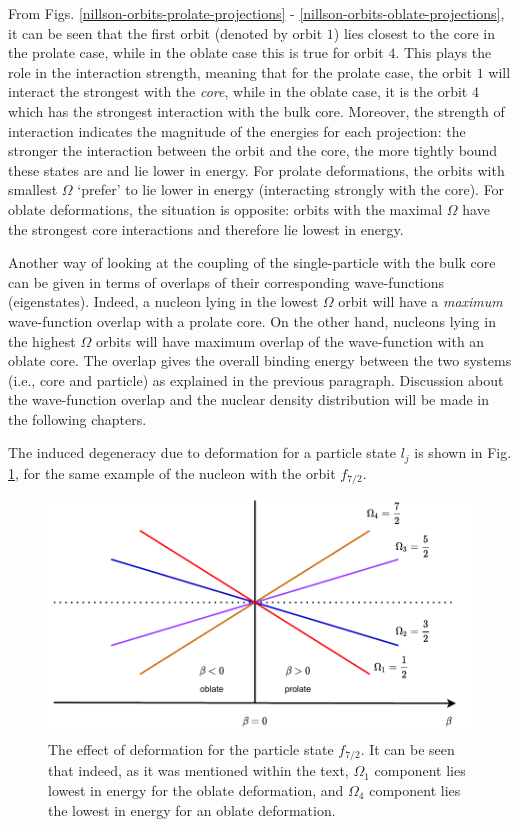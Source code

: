 From Figs. \ref{nillson-orbits-prolate-projections} - \ref{nillson-orbits-oblate-projections}, it can be seen that the first orbit (denoted by orbit $1$) lies closest to the core in the prolate case, while in the oblate case this is true for orbit $4$. This plays the role in the interaction strength, meaning that for the prolate case, the orbit $1$ will interact the strongest with the \emph{core}, while in the oblate case, it is the orbit $4$ which has the strongest interaction with the bulk core. Moreover, the strength of interaction indicates the magnitude of the energies for each projection: the stronger the interaction between the orbit and the core, the more tightly bound these states are and lie lower in energy. For prolate deformations, the orbits with smallest $\Omega$ `prefer' to lie lower in energy (interacting strongly with the core). For oblate deformations, the situation is opposite: orbits with the maximal $\Omega$ have the strongest core interactions and therefore lie lowest in energy.

Another way of looking at the coupling of the single-particle with the bulk core can be given in terms of overlaps of their corresponding wave-functions (eigenstates). Indeed, a nucleon lying in the lowest $\Omega$ orbit will have a \emph{maximum} wave-function overlap with a prolate core. On the other hand, nucleons lying in the highest $\Omega$ orbits will have maximum overlap of the wave-function with an oblate core. The overlap gives the overall binding energy between the two systems (i.e., core and particle) as explained in the previous paragraph. Discussion about the wave-function overlap and the nuclear density distribution \cite{frauendorf2014transverse, das2018nuclear} will be made in the following chapters.

The induced degeneracy due to deformation for a particle state $l_j$ is shown in Fig. \ref{nillson-orbits-splittings}, for the same example of the nucleon with the orbit $f_{7/2}$.

\begin{figure}
    \centering
    \includegraphics[scale=0.95]{Chapters/Figures/nillson_SP_splittings.pdf}
    \caption{The effect of deformation for the particle state $f_{7/2}$. It can be seen that indeed, as it was mentioned within the text, $\Omega_1$ component lies lowest in energy for the oblate deformation, and $\Omega_4$ component lies the lowest in energy for an oblate deformation.}
    \label{nillson-orbits-splittings}
\end{figure}

